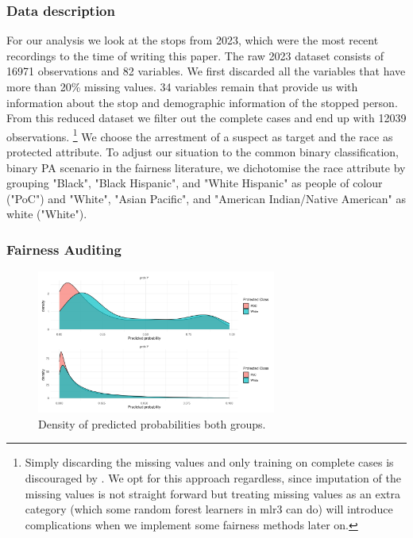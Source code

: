 \subsubsection*{Data description}
For our analysis we look at the stops from 2023, which were the most recent recordings to the time of writing this paper. The raw 2023 dataset consists of 16971 observations and 82 variables. We first discarded all the variables that have more than 20\% missing values.
34 variables remain that provide us with information about the stop and demographic information of the stopped person. From this reduced dataset we filter out the complete cases and end up with 12039 observations.
\footnote{Simply discarding the missing values and only training on complete cases is discouraged by \cite{fernando2021}. We opt for this approach regardless, since imputation of the missing values is not straight forward
but treating missing values as an extra category (which some random forest learners in mlr3 can do) will introduce complications when we implement some fairness methods later on.}
We choose the arrestment of a suspect as target and the race as protected attribute. To adjust our situation to the common binary classification, binary PA scenario in the fairness literature, we dichotomise the race attribute by grouping "Black", "Black Hispanic", and "White Hispanic" as people of colour ("PoC") and "White", "Asian Pacific", and "American Indian/Native American" as white ("White").


\subsubsection*{Fairness Auditing}
\begin{figure}
    \centering
    \includegraphics[width=0.7\textwidth]{../figures/sqf_case_study_plot7.png}
    \caption{Density of predicted probabilities both groups.}
    \label{fig:fairness_density}
\end{figure}

